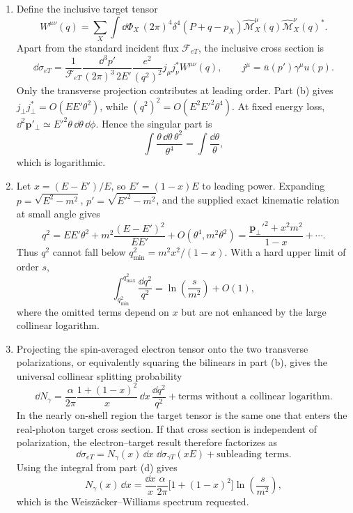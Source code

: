 \begin{enumerate}
\begin{enumerate}
\((E+E')/(E-E')\).
\item
Define the inclusive target tensor
\[
 W^{\mu\nu}(q)=\sum_X\int \dd\Phi_X\,
 (2\pi)^4\delta^4(P+q-p_X)
 \widehat{\mathcal M}_X^\mu(q)
 \widehat{\mathcal M}_X^{\nu}(q)^*.
\]
Apart from the standard incident flux \(\mathcal F_{eT}\), the inclusive
cross section is
\[
 \dd\sigma_{eT}=
 \frac1{\mathcal F_{eT}}
 \frac{\dd^3p'}{(2\pi)^3\,2E'}
 \frac{e^2}{(q^2)^2}
 j_\mu j_\nu^*W^{\mu\nu}(q),
 \qquad j^\mu=\bar u(p')\gamma^\mu u(p).
\]
Only the transverse projection contributes at leading order.  Part (b)
gives \(j_\perp j_\perp^*=O(EE'\theta^2)\), while
\((q^2)^2=O(E^2E'^2\theta^4)\).  At fixed energy loss,
\(\dd^2\mathbf p'_\perp\simeq E'^2\theta\,\dd\theta\,\dd\phi\).  Hence the
singular part is
\[
 \int\frac{\theta\,\dd\theta\,\theta^2}{\theta^4}
 =\int\frac{\dd\theta}{\theta},
\]
which is logarithmic.
\item
Let \(x=(E-E')/E\), so \(E'=(1-x)E\) to leading power.  Expanding
\(p=\sqrt{E^2-m^2}\), \(p'=\sqrt{E'^2-m^2}\), and the supplied exact
kinematic relation at small angle gives
\[
 q^2=EE'\theta^2
 +m^2\frac{(E-E')^2}{EE'}+O(\theta^4,m^2\theta^2)
 =\frac{\mathbf p_\perp'^2+x^2m^2}{1-x}+\cdots.
\]
Thus \(q^2\) cannot fall below
\(q^2_{\min}=m^2x^2/(1-x)\).  With a hard upper limit of order \(s\),
\[
 \int_{q^2_{\min}}^{q^2_{\max}}\frac{\dd q^2}{q^2}
 =\ln\!\left(\frac{s}{m^2}\right)+O(1),
\]
where the omitted terms depend on \(x\) but are not enhanced by the large
collinear logarithm.
\item
Projecting the spin-averaged electron tensor onto the two transverse
polarizations, or equivalently squaring the bilinears in part (b), gives
the universal collinear splitting probability
\[
 \dd N_\gamma=
 \frac{\alpha}{2\pi}
 \frac{1+(1-x)^2}{x}\,\dd x\,\frac{\dd q^2}{q^2}
 +\text{terms without a collinear logarithm}.
\]
In the nearly on-shell region the target tensor is the same one that enters
the real-photon target cross section.  If that cross section is independent
of polarization, the electron--target result therefore factorizes as
\[
 \dd\sigma_{eT}=N_\gamma(x)\,\dd x\;
 \dd\sigma_{\gamma T}(xE)+\text{subleading terms}.
\]
Using the integral from part (d) gives
\[
 N_\gamma(x)\,\dd x
 =\frac{\dd x}{x}\frac{\alpha}{2\pi}
 \bigl[1+(1-x)^2\bigr]
 \ln\!\left(\frac{s}{m^2}\right),
\]
which is the Weisz\"acker--Williams spectrum requested.
\end{enumerate}


\end{enumerate}
